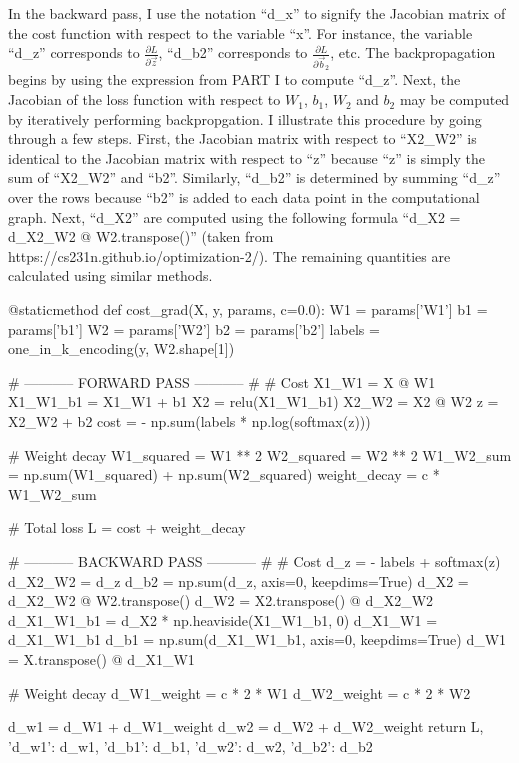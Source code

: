\documentclass{article}
\begin{document}
In the backward pass, I use the notation ``d\_x'' to signify the Jacobian matrix of the cost function with respect to the variable ``x''.
For instance, the variable ``d\_z'' corresponds to $\frac{\partial L}{\partial \vec z}$, ``d\_b2'' corresponds to $\frac{\partial L}{\partial \vec b_2}$, etc. 
The backpropagation begins by using the expression from PART I to compute ``d\_z''. Next, the Jacobian of the loss function with respect to $W_1$, $b_1$, $W_2$ and $b_2$ may be computed by iteratively performing backpropgation. I illustrate this procedure by going through a few steps.
First, the Jacobian matrix with respect to ``X2\_W2'' is identical to the Jacobian matrix with respect to ``z'' because ``z'' is simply the sum of ``X2\_W2'' and ``b2''.
Similarly, ``d\_b2'' is determined by summing ``d\_z'' over the rows because ``b2'' is added to each data point in the computational graph.
Next, ``d\_X2'' are computed using the following formula ``d\_X2 = d\_X2\_W2 @ W2.transpose()'' (taken from https://cs231n.github.io/optimization-2/).
The remaining quantities are calculated using similar methods.
\begin{python}
@staticmethod
def cost_grad(X, y, params, c=0.0):
	W1 = params['W1']
	b1 = params['b1']
	W2 = params['W2']
	b2 = params['b2']
	labels = one_in_k_encoding(y, W2.shape[1])
	
	# ----------- FORWARD PASS ----------- #
	# Cost
	X1_W1 = X @ W1
	X1_W1_b1 = X1_W1 + b1
	X2 = relu(X1_W1_b1)
	X2_W2 = X2 @ W2
	z = X2_W2 + b2
	cost = - np.sum(labels * np.log(softmax(z)))
	
	# Weight decay
	W1_squared = W1 ** 2
	W2_squared = W2 ** 2
	W1_W2_sum = np.sum(W1_squared) + np.sum(W2_squared)
	weight_decay = c * W1_W2_sum
	
	# Total loss
	L = cost + weight_decay
	
	#  ----------- BACKWARD PASS ----------- #
	# Cost
	d_z = - labels + softmax(z)
	d_X2_W2 = d_z
	d_b2 = np.sum(d_z, axis=0, keepdims=True)
	d_X2 = d_X2_W2 @ W2.transpose()
	d_W2 = X2.transpose() @ d_X2_W2
	d_X1_W1_b1 = d_X2 * np.heaviside(X1_W1_b1, 0)
	d_X1_W1 = d_X1_W1_b1
	d_b1 = np.sum(d_X1_W1_b1, axis=0, keepdims=True)
	d_W1 = X.transpose() @ d_X1_W1
	
	# Weight decay
	d_W1_weight = c * 2 * W1
	d_W2_weight = c * 2 * W2
	
	d_w1 = d_W1 + d_W1_weight
	d_w2 = d_W2 + d_W2_weight
	return L, {'d_w1': d_w1, 'd_b1': d_b1, 'd_w2': d_w2, 'd_b2': d_b2}
\end{python}
\end{document}
